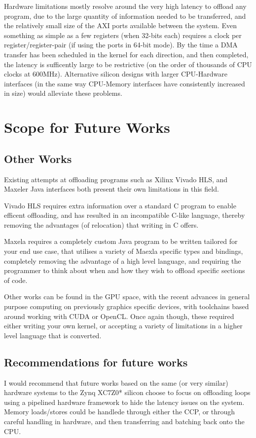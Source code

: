 \documentclass[a4paper]{article}
\begin{document}
  Hardware limitations mostly resolve around the very high latency to offload any program, due to the large quantity of information needed to be transferred, and the relatively small size of the AXI ports available between the system. Even something as simple as a few registers (when 32-bits each) requires a clock per register/register-pair (if using the ports in 64-bit mode). By the time a DMA transfer has been scheduled in the kernel for each direction, and then completed, the latency is sufficently large to be restrictive (on the order of thousands of CPU clocks at 600MHz). Alternative silicon designs with larger CPU-Hardware interfaces (in the same way CPU-Memory interfaces have consistently increased in size) would alleviate these problems.

\section{Scope for Future Works}
\subsection{Other Works}
Existing attempts at offloading programs such as Xilinx Vivado HLS\cite{hls}, and Maxeler\cite{mf-fpga} Java interfaces both present their own limitations in this field.

Vivado HLS requires extra information over a standard C program to enable efficent offloading, and has resulted in an incompatible C-like language, thereby removing the advantages (of relocation) that writing in C offers.

Maxela requires a completely custom Java program to be written tailored for your end use case, that utilises a variety of Maexla specific types and bindings, completely removing the advantage of a high level language, and requiring the programmer to think about when and how they wish to offload specific sections of code.

Other works can be found in the GPU space, with the recent advances in general purpose computing on previously graphics specific devices, with toolchains based around working with CUDA\cite{cuda} or OpenCL. Once again though, these required either writing your own kernel, or accepting a variety of limitations in a higher level language that is converted.

\subsection{Recommendations for future works}
I would recommend that future works based on the same (or very similar) hardware systems to the Zynq XC7Z0* silicon choose to focus on offloading loops using a pipelined hardware framework to hide the latency issues on the system. Memory loads/stores could be handlede through either the CCP, or through careful handling in hardware, and then transferring and batching back onto the CPU.
\end{document}
